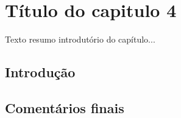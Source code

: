 \graphicspath{{figuras/}}

\chapter{Título do capitulo 4}
\label{cap4}

Texto resumo introdutório do capítulo...

\section{Introdução}


\section{Comentários finais}